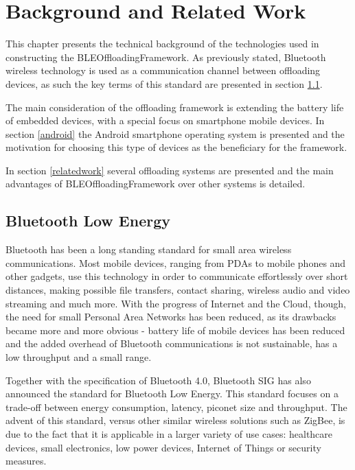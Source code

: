 \chapter{Background and Related Work}
\label{chapter:stateoftheart}

This chapter presents the technical background of the technologies used in constructing the BLEOffloadingFramework. As previously stated, Bluetooth wireless technology is used as a communication channel between offloading devices, as such the key terms of this standard are presented in section \ref{ble}.

The main consideration of the offloading framework is extending the battery life of embedded devices, with a special focus on smartphone mobile devices. In section \ref{android} the Android smartphone operating system is presented and the motivation for choosing this type of devices as the beneficiary for the framework.

In section \ref{relatedwork} several offloading systems are presented and the main advantages of BLEOffloadingFramework over other systems is detailed.

\section{Bluetooth Low Energy}
\label{ble}

Bluetooth has been a long standing standard for small area wireless communications. Most mobile devices, ranging from PDAs to mobile phones and other gadgets, use this technology in order to communicate effortlessly over short distances, making possible file transfers, contact sharing, wireless audio and video streaming and much more. With the progress of Internet and the Cloud, though, the need for small Personal Area Networks has been reduced, as its drawbacks became more and more obvious - battery life of mobile devices has been reduced and the added overhead of Bluetooth communications is not sustainable, has a low throughput and a small range. 

Together with the specification of Bluetooth 4.0, Bluetooth SIG has also announced the standard for Bluetooth Low Energy\cite{gomez2012overview}. This standard focuses on a trade-off between energy consumption, latency, piconet size and throughput. The advent of this standard, versus other similar wireless solutions such as ZigBee, is due to the fact that it is applicable in a larger variety of use cases: healthcare devices, small electronics, low power devices, Internet of Things or security measures.

